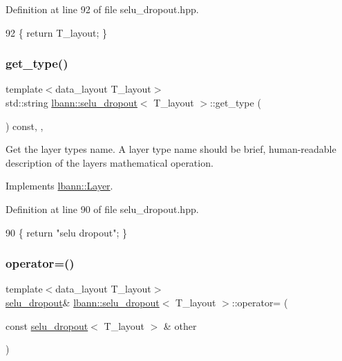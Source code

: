 Definition at line 92 of file selu\+\_\+dropout.\+hpp.


\begin{DoxyCode}
92 \{ \textcolor{keywordflow}{return} T\_layout; \}
\end{DoxyCode}
\mbox{\label{classlbann_1_1selu__dropout_a983e7bf62f995a1fe24363f7b1ff0182}} 
\subsubsection{\texorpdfstring{get\+\_\+type()}{get\_type()}}
{\footnotesize\ttfamily template$<$data\+\_\+layout T\+\_\+layout$>$ \\
std\+::string \hyperlink{classlbann_1_1selu__dropout}{lbann\+::selu\+\_\+dropout}$<$ T\+\_\+layout $>$\+::get\+\_\+type (\begin{DoxyParamCaption}{ }\end{DoxyParamCaption}) const\hspace{0.3cm}{\ttfamily [inline]}, {\ttfamily [override]}, {\ttfamily [virtual]}}

Get the layer type\textquotesingle{}s name. A layer type name should be brief, human-\/readable description of the layer\textquotesingle{}s mathematical operation. 

Implements \hyperlink{classlbann_1_1Layer_a0fa0ea9160b490c151c0a17fde4f7239}{lbann\+::\+Layer}.



Definition at line 90 of file selu\+\_\+dropout.\+hpp.


\begin{DoxyCode}
90 \{ \textcolor{keywordflow}{return} \textcolor{stringliteral}{"selu dropout"}; \}
\end{DoxyCode}
\mbox{\label{classlbann_1_1selu__dropout_aa4563c71596c91bb568a6808d38e8758}} 
\subsubsection{\texorpdfstring{operator=()}{operator=()}}
{\footnotesize\ttfamily template$<$data\+\_\+layout T\+\_\+layout$>$ \\
\hyperlink{classlbann_1_1selu__dropout}{selu\+\_\+dropout}\& \hyperlink{classlbann_1_1selu__dropout}{lbann\+::selu\+\_\+dropout}$<$ T\+\_\+layout $>$\+::operator= (\begin{DoxyParamCaption}\item[{const \hyperlink{classlbann_1_1selu__dropout}{selu\+\_\+dropout}$<$ T\+\_\+layout $>$ \&}]{other }\end{DoxyParamCaption})\hspace{0.3cm}{\ttfamily [inline]}}



